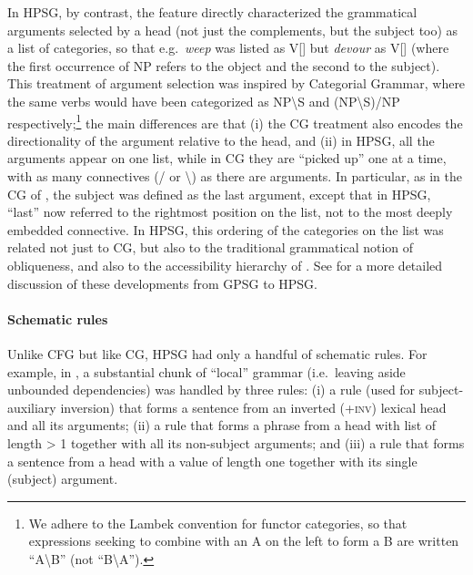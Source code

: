 \documentclass[output=paper
 	        ,biblatex
                ,babelshorthands
                ,newtxmath
                ,draftmode
                ,colorlinks, citecolor=brown
]{langscibook}
\begin{document}
\noindent
In HPSG, by contrast, the
\subcat feature directly characterized the grammatical arguments selected by a head (not just the
complements, but the subject too) as a list of categories, so that e.g.~\emph{weep} was listed as
V[\subcat {}] but \emph{devour} as V[\subcat {}] (where the first occurrence of NP refers to the object and the second to the subject). This treatment of argument selection was inspired by Categorial Grammar, where the same verbs would have been categorized as NP{\textbackslash}S and (NP{\textbackslash}S)/NP respectively;\footnote{We adhere to the Lambek convention for functor categories, so that expressions seeking to combine with an A on the left to form a B are written ``A{\textbackslash}B'' (not ``B{\textbackslash}A'').} the main differences are that (i) the CG treatment also encodes the directionality of the argument relative to the head, and (ii) in HPSG, all the arguments appear on one list, while in CG they are ``picked up'' one at a time, with as many
connectives (/ or \textbackslash) as there are arguments. In particular, as in the CG of \citet{Dowty82b}, the subject was defined as the last argument, except that in HPSG, ``last'' now referred to the rightmost position on the \subcat list, not to the most deeply embedded connective. In HPSG, this
ordering of the categories on the \subcat list was related not just to CG, but also to the traditional grammatical notion of obliqueness, and also to the accessibility hierarchy of \citet{KC77a}.  See \citet[Section 4]{MWArgSt} for a more detailed discussion of these developments from GPSG to HPSG.

\paragraph*{Schematic rules} Unlike CFG but like CG, HPSG had only a handful of schematic rules. For example, in \citet{Pollard85a-u}, a substantial chunk of  ``local'' grammar (i.e.~leaving aside unbounded dependencies) was handled by three rules: (i) a rule (used for subject-auxiliary inversion) that forms a sentence from an inverted (+\textsc{inv}) lexical head and all its arguments; (ii) a rule that forms a phrase from a head with \subcat list of length > 1 together with all its non-subject arguments; and (iii) a rule that forms a sentence from a head with a \subcat value of length one together with its single (subject) argument.
\end{document}
